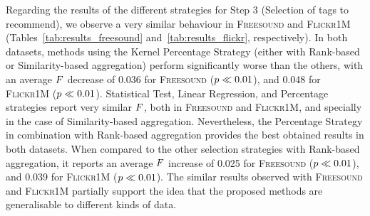 Regarding the results of the different strategies for Step 3 (Selection of tags to recommend), we observe a very similar behaviour in \textsc{Freesound} and \textsc{Flickr\-1M} (Tables~\ref{tab:results_freesound} and~\ref{tab:results_flickr}, respectively). %
In both datasets, methods using the Kernel Percentage Strategy (either with Rank-based or Similarity-based aggregation) perform significantly worse than the others, with an average $F$ decrease of 0.036 for \textsc{Freesound} ($p\ll0.01$), and 0.048 for \textsc{Flickr1M} ($p\ll0.01$). Statistical Test, Linear Regression, and Percentage strategies report very similar $F$, both in \textsc{Freesound} and \textsc{Flickr1M}, and specially in the case of Similarity-based aggregation. Nevertheless, the Percentage Strategy in combination with Rank-based aggregation provides the best obtained results in both datasets. When compared to the other selection strategies with Rank-based aggregation, it reports an average $F$ increase of 0.025 for \textsc{Freesound} ($p\ll0.01$), and 0.039 for \textsc{Flickr1M} ($p\ll0.01$).
The similar results observed with \textsc{Freesound} and \textsc{Flickr1M} partially support the idea that the proposed methods are generalisable to different kinds of data.

